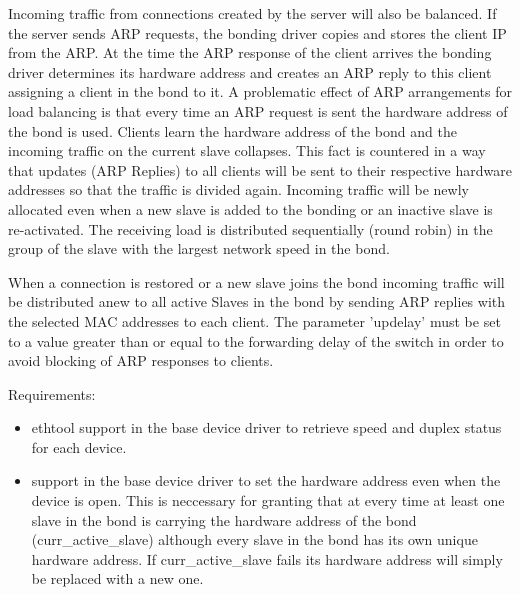 \begin{description}
\begin{description}
  Incoming traffic from connections created by the server will also be 
  balanced. If the server sends ARP requests, the bonding driver 
  copies and stores the client IP from the ARP. At the time the ARP 
  response of the client arrives the bonding driver determines its 
  hardware address and creates an ARP reply to this client assigning 
  a client in the bond to it. A problematic effect of ARP arrangements 
  for load balancing is that every time an ARP request is sent the 
  hardware address of the bond is used. Clients learn the hardware 
  address of the bond and the incoming traffic on the current slave 
  collapses. This fact is countered in a way that updates (ARP Replies) 
  to all clients will be sent to their respective hardware addresses so 
  that the traffic is divided again. Incoming traffic will be newly 
  allocated even when a new slave is added to the bonding or an 
  inactive slave is re-activated. The receiving load is distributed
  sequentially (round robin) in the group of the slave with the largest
  network speed in the bond.
  
  When a connection is restored or a new slave joins the bond incoming 
  traffic will be distributed anew to all active Slaves in the bond 
  by sending ARP replies with the selected MAC addresses to each client. 
  The parameter 'updelay' must be set to a value greater than or equal 
  to the forwarding delay of the switch in order to avoid blocking of
  ARP responses to clients.
  
  Requirements:
  \begin{itemize}

    \item ethtool support in the base device driver to retrieve
          speed and duplex status for each device.
    
    \item support in the base device driver to set the hardware address
	  even when the device is open. This is neccessary for granting
	  that at every time at least one slave in the bond is carrying
	  the hardware address of the bond (curr\_active\_slave) although
	  every slave in the bond has its own unique hardware address.
          If curr\_active\_slave fails its hardware address will simply be 
          replaced with a new one.

  \end{itemize}

\end{description}



\end{description}
